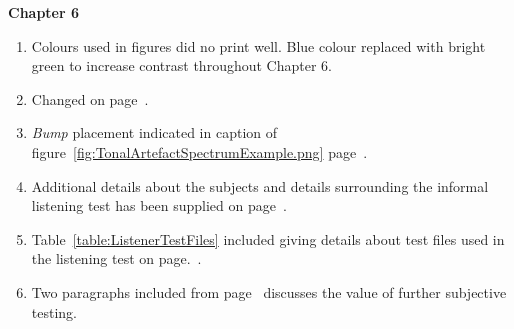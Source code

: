 \textbf{Chapter 6}
\begin{enumerate}
\item Colours used in figures did no print well. Blue colour replaced with bright green to increase contrast throughout Chapter 6.
\item Changed on page~\pageref{eq:RestBasicModel}.
\item \emph{Bump} placement indicated in caption of figure~\ref{fig:TonalArtefactSpectrumExample.png} page~\pageref{fig:TonalArtefactSpectrumExample.png}.
\item Additional details about the subjects and details surrounding the informal listening test has been supplied on page~\pageref{corrections:subjects}.
\item Table~\ref{table:ListenerTestFiles} included giving details about test files used in the listening test on page.~\pageref{table:ListenerTestFiles}.
\item Two paragraphs included from page~\pageref{corrections:conclusionSubjective} discusses the value of further subjective testing.
\end{enumerate}